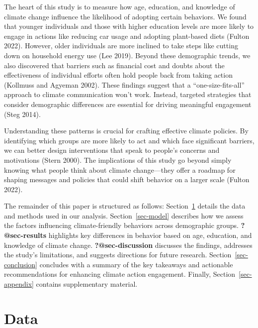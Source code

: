 \documentclass[
  letterpaper,
  DIV=11,
  numbers=noendperiod]{scrartcl}
\begin{document}
The heart of this study is to measure how age, education, and knowledge
of climate change influence the likelihood of adopting certain
behaviors. We found that younger individuals and those with higher
education levels are more likely to engage in actions like reducing car
usage and adopting plant-based diets (Fulton 2022). However, older
individuals are more inclined to take steps like cutting down on
household energy use (Lee 2019). Beyond these demographic trends, we
also discovered that barriers such as financial cost and doubts about
the effectiveness of individual efforts often hold people back from
taking action (Kollmuss and Agyeman 2002). These findings suggest that a
``one-size-fits-all'' approach to climate communication won't work.
Instead, targeted strategies that consider demographic differences are
essential for driving meaningful engagement (Steg 2014).

Understanding these patterns is crucial for crafting effective climate
policies. By identifying which groups are more likely to act and which
face significant barriers, we can better design interventions that speak
to people's concerns and motivations (Stern 2000). The implications of
this study go beyond simply knowing what people think about climate
change---they offer a roadmap for shaping messages and policies that
could shift behavior on a larger scale (Fulton 2022).

The remainder of this paper is structured as follows:
Section~\ref{sec-data} details the data and methods used in our
analysis. Section~\ref{sec-model} describes how we assess the factors
influencing climate-friendly behaviors across demographic groups.
\textbf{?@sec-results} highlights key differences in behavior based on
age, education, and knowledge of climate change.
\textbf{?@sec-discussion} discusses the findings, addresses the study's
limitations, and suggests directions for future research.
Section~\ref{sec-conclusion} concludes with a summary of the key
takeaways and actionable recommendations for enhancing climate action
engagement. Finally, Section~\ref{sec-appendix} contains supplementary
material.

\section{Data}\label{sec-data}
\end{document}
